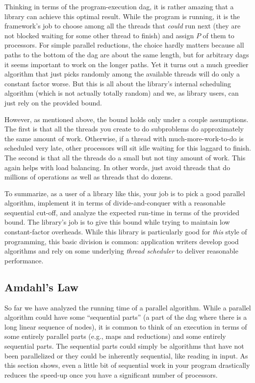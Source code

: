\documentclass[10pt]{article}
\begin{document}
Thinking in terms of the program-execution dag, it is rather amazing
that a library can achieve this optimal result.  While the program is
running, it is the framework's job to choose among all the threads
that \emph{could} run next (they are not blocked waiting for some
other thread to finish) and assign $P$ of them to processors.  For
simple parallel reductions, the choice hardly matters because all
paths to the bottom of the dag are about the same length, but for
arbitrary dags it seems important to work on the longer paths.  Yet it
turns out a much greedier algorithm that just picks randomly among the
available threads will do only a constant factor worse.  But this is
all about the library's internal scheduling algorithm (which is not
actually totally random) and we, as library users, can just rely on
the provided bound.

However, as mentioned above, the bound holds only under a couple
assumptions.  The first is that all the threads you create to do
subproblems do approximately the same amount of work.  Otherwise, if a
thread with much-more-work-to-do is scheduled very late, other
processors will sit idle waiting for this laggard to finish.  The
second is that all the threads do a small but not tiny amount of work.
This again helps with load balancing. In other words, just avoid
threads that do millions of operations as well as threads that do
dozens.

To summarize, as a user of a library like this, your job is to pick a
good parallel algorithm, implement it in terms of divide-and-conquer
with a reasonable sequential cut-off, and analyze the expected
run-time in terms of the provided bound.  The library's job is to give
this bound while trying to maintain low constant-factor overheads.
While this library is particularly good for \emph{this} style of
programming, this basic division is common: application writers
develop good algorithms and rely on some underlying \emph{thread scheduler}
 to deliver reasonable performance.

\subsection{Amdahl's Law}

So far we have analyzed the running time of a parallel algorithm.
While a parallel algorithm could have some ``sequential parts''
(a part of the dag where there is a long linear sequence of nodes), it
is common to think of an execution in terms of some entirely parallel
parts (e.g., maps and reductions) and some entirely sequential parts.
The sequential parts could simply be algorithms that have not been
parallelized or they could be inherently sequential, like reading in
input.  As this section shows, even a little bit of sequential work in
your program drastically reduces the speed-up once you have a
significant number of processors.  
\end{document}
